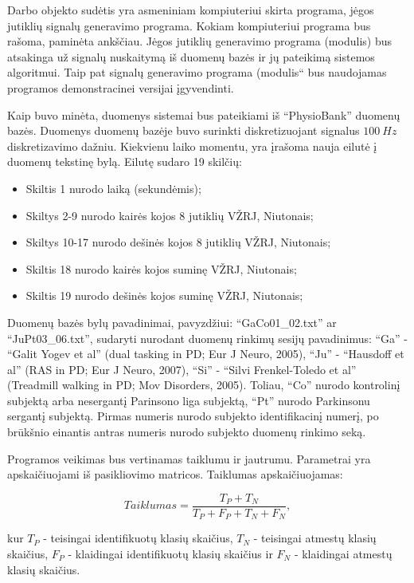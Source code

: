 \documentclass[]{vgtuef}
\begin{document}
Darbo objekto sudėtis yra asmeniniam kompiuteriui skirta programa,
jėgos jutiklių signalų generavimo programa. Kokiam kompiuteriui
programa bus rašoma, paminėta ankščiau. Jėgos jutiklių generavimo
programa (modulis) bus atsakinga už signalų nuskaitymą iš duomenų
bazės ir jų pateikimą sistemos algoritmui. Taip pat signalų generavimo
programa (modulis“ bus naudojamas programos demonstracinei versijai
įgyvendinti.

Kaip buvo minėta, duomenys sistemai bus pateikiami iš ``PhysioBank''
duomenų bazės. Duomenys duomenų bazėje buvo surinkti diskretizuojant
signalus $100~Hz$ diskretizavimo dažniu. Kiekvienu laiko momentu, yra
įrašoma nauja eilutė į duomenų tekstinę bylą. Eilutę sudaro 19
skilčių:

\begin{itemize}
\item Skiltis 1 nurodo laiką (sekundėmis);
\item Skiltys 2-9 nurodo kairės kojos 8 jutiklių VŽRJ, Niutonais;
\item Skiltys 10-17 nurodo dešinės kojos 8 jutiklių VŽRJ, Niutonais;
\item Skiltis 18 nurodo kairės kojos suminę VŽRJ, Niutonais;
\item Skiltis 19 nurodo dešinės kojos suminę VŽRJ, Niutonais;
\end{itemize}

Duomenų bazės bylų pavadinimai, pavyzdžiui: ``GaCo01\_02.txt'' ar
``JuPt03\_06.txt'', sudaryti nurodant duomenų rinkimų sesijų pavadinimus:
``Ga'' - ``Galit Yogev et al'' (dual tasking in PD; Eur J Neuro, 2005),
``Ju'' - ``Hausdoff et al'' (RAS in PD; Eur J Neuro, 2007), ``Si'' - ``Silvi
Frenkel-Toledo et al'' (Treadmill walking in PD; Mov Disorders,
2005). Toliau, ``Co'' nurodo kontrolinį subjektą arba nesergantį
Parinsono liga subjektą, ``Pt'' nurodo Parkinsonu sergantį
subjektą. Pirmas numeris nurodo subjekto identifikacinį numerį, po
brūkšnio einantis antras numeris nurodo subjekto duomenų rinkimo seką.

Programos veikimas bus vertinamas taiklumu ir jautrumu. Parametrai yra
apskaičiuojami iš pasikliovimo matricos. Taiklumas apskaičiuojamas:

\begin{equation}
Taiklumas = \frac{T_P + T_N}{T_P + F_P + T_N + F_N},
\end{equation}

kur $T_P$ - teisingai identifikuotų klasių skaičius, $T_N$ - teisingai
atmestų klasių skaičius, $F_P$ - klaidingai identifikuotų klasių
skaičius ir $F_N$ - klaidingai atmestų klasių skaičius.
\end{document}
